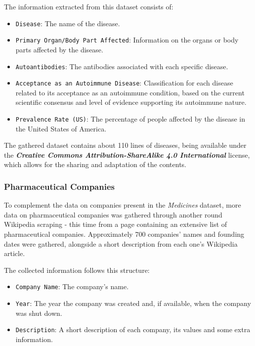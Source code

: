 \documentclass[sigconf]{acmart}
\begin{document}
The information extracted from this dataset consists of:
\begin{itemize}
        \item {\texttt{Disease}}: The name of the disease.
	\item {\texttt{Primary Organ/Body Part Affected}}: Information on the organs or body parts affected by the disease.
	\item {\texttt{Autoantibodies}}: The antibodies associated with each specific disease.
	\item {\texttt{Acceptance as an Autoimmune Disease}}: Classification for each disease related to its acceptance as an autoimmune condition, based on the current scientific consensus and level of evidence supporting its autoimmune nature.
	\item {\texttt{Prevalence Rate (US)}}: The percentage of people affected by the disease in the United States of America.
\end{itemize}

The gathered dataset contains about 110 lines of diseases, being available under the \textit{\textbf{Creative Commons Attribution-ShareAlike 4.0 International}}\cite{wikipedia_cc} license, which allows for the sharing and adaptation of the contents.

\subsubsection{Pharmaceutical Companies}

To complement the data on companies present in the \textit{Medicines} dataset, more data on pharmaceutical companies was gathered through another round Wikipedia scraping - this time from a page containing an extensive list of pharmaceutical companies\cite{companies_dataset}. Approximately 700 companies' names and founding dates were gathered, alongside a short description from each one's Wikipedia article.

The collected information follows this structure:
\begin{itemize}
	\item {\texttt{Company Name}}: The company's name.
	\item {\texttt{Year}}: The year the company was created and, if available, when the company was shut down.
	\item {\texttt{Description}}: A short description of each company, its values and some extra information.
\end{itemize}
\end{document}

